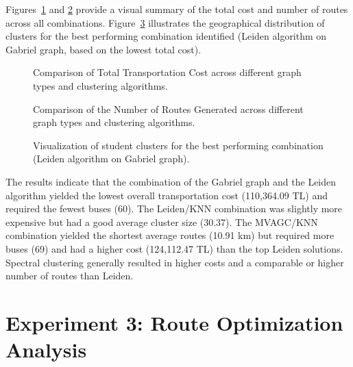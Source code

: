 Figures~\ref{fig:cost_comparison} and \ref{fig:routes_comparison} provide a visual summary of the total cost and number of routes across all combinations. Figure~\ref{fig:best_clustering_viz} illustrates the geographical distribution of clusters for the best performing combination identified (Leiden algorithm on Gabriel graph, based on the lowest total cost).

\begin{figure}[h]
    \centering
    \caption{Comparison of Total Transportation Cost across different graph types and clustering algorithms.}
    \label{fig:cost_comparison}
\end{figure}

\begin{figure}[h]
    \centering
    \caption{Comparison of the Number of Routes Generated across different graph types and clustering algorithms.}
    \label{fig:routes_comparison}
\end{figure}

\begin{figure}[h]
    \centering
    \caption{Visualization of student clusters for the best performing combination (Leiden algorithm on Gabriel graph).}
    \label{fig:best_clustering_viz}
\end{figure}

The results indicate that the combination of the Gabriel graph and the Leiden algorithm yielded the lowest overall transportation cost (110,364.09 TL) and required the fewest buses (60). The Leiden/KNN combination was slightly more expensive but had a good average cluster size (30.37). The MVAGC/KNN combination yielded the shortest average routes (10.91 km) but required more buses (69) and had a higher cost (124,112.47 TL) than the top Leiden solutions. Spectral clustering generally resulted in higher costs and a comparable or higher number of routes than Leiden.

\section{Experiment 3: Route Optimization Analysis}
\label{sec:exp_route_opt}

